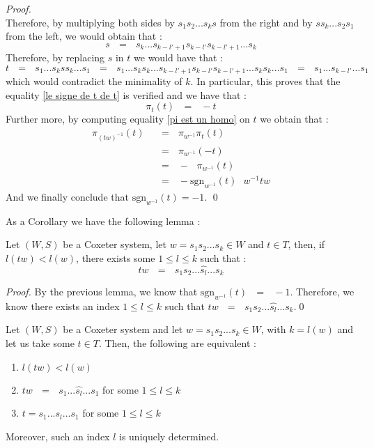 \documentclass[envcountsame,envcountchap]{svmono}
\newcommand{\qq}{\text{ }}
\begin{document}
\begin{proof}
\begin{equation}
	\end{equation}
	Therefore, by multiplying both sides by $s_1s_2...s_ks$ from the right and by $ss_k...s_2s_1$ from the left, we would obtain that :
	\begin{equation}
	s\qq=\qq s_k...s_{k-l'+1}s_{k-l'}s_{k-l'+1}...s_k
	\end{equation}
	Therefore, by replacing $s$ in $t$ we would have that :
	\begin{equation}
	t\qq=\qq s_1...s_kss_k...s_1\qq=\qq s_1...s_ks_k...s_{k-l'+1}s_{k-l'}s_{k-l'+1}...s_ks_k...s_1\qq=\qq s_1...s_{k-l'}...s_1
	\end{equation}
	which would contradict the minimality of $k$. In particular, this proves that the equality \eqref{le signe de t de t} is verified and we have that :
	\begin{equation}
	\pi_t(t)\qq=\qq -t
	\end{equation}
	Further more, by computing equality \eqref{pi est un homo} on $t$ we obtain that :
	\begin{equation}
	\begin{split}
	\pi_{(tw)^{-1}}(t)\qq&=\qq \pi_{w^{-1}}\pi_t(t)\qq\\
	&=\qq \pi_{w^{-1}}(-t)\qq\\
	&=\qq -\qq \pi_{w^{-1}}(t)\\
	&=\qq -\mbox{sgn}_{w^{-1}}(t)\qq w^{-1}tw
	\end{split}
	\end{equation}
	And we finally conclude that $\mbox{sgn}_{w^{-1}}(t)=-1$. \qed

\end{proof}
As a Corollary we have the following lemma :
\begin{lemma}
	Let $(W,S)$ be a Coxeter system, let $w=s_1s_2...s_k\in W$ and $t\in T$, then, if $l(tw)<l(w)$, there exists some $1\leq l\leq k$ such that :
	\begin{equation}
	tw\qq=\qq s_1s_2...\hat{s_l}... s_k
	\end{equation}
\end{lemma}
\begin{proof}
	By the previous lemma, we know that $\mbox{sgn}_{w^{-1}}(t)\qq=\qq -1$. Therefore, we know there exists an index $1\leq l\leq k$ such that $tw\qq=\qq s_1s_2...\hat{s_l}... s_k$.\qed
\end{proof}
\begin{lemma}\label{les equivalences pour tw}
	Let $(W,S)$ be a Coxeter system and let $w=s_1s_2...s_k\in W$, with $k=l(w)$ and let us take some $t\in T$. Then, the following are equivalent :
	\begin{enumerate}
		\item $l(tw)<l(w)$
		\item $tw\qq=\qq s_1...\hat{s_l}...s_1$ for some $1\leq l\leq k$
		\item $t=s_1...s_l...s_1$ for some $1\leq l\leq k$
	\end{enumerate}
Moreover, such an index $l$ is uniquely determined.
\end{lemma}
\end{document}
